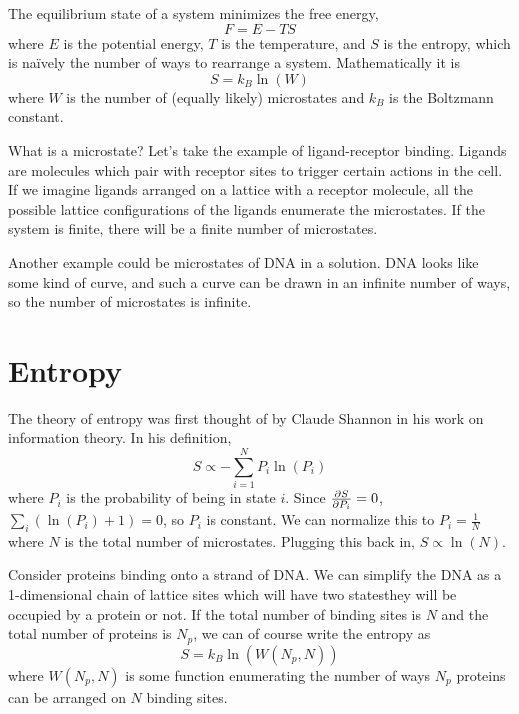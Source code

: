 \documentclass[a4paper,twoside,master.tex]{subfiles}
\begin{document}
The equilibrium state of a system minimizes the free energy,
\begin{equation}
    F = E - TS\tag{Free Energy}
\end{equation}
where $ E $ is the potential energy, $ T $ is the temperature, and $ S $ is the entropy, which is na\"ively the number of ways to rearrange a system. Mathematically it is
\begin{equation}
    S = k_B \ln(W)
\end{equation}
where $ W $ is the number of (equally likely) microstates and $ k_B $ is the Boltzmann constant.

What is a microstate? Let's take the example of ligand-receptor binding. Ligands are molecules which pair with receptor sites to trigger certain actions in the cell. If we imagine ligands arranged on a lattice with a receptor molecule, all the possible lattice configurations of the ligands enumerate the microstates. If the system is finite, there will be a finite number of microstates.

Another example could be microstates of DNA in a solution. DNA looks like some kind of curve, and such a curve can be drawn in an infinite number of ways, so the number of microstates is infinite.

\section{Entropy}\label{sec:entropy}

The theory of entropy was first thought of by Claude Shannon in his work on information theory. In his definition,
\begin{equation}
    S \propto - \sum_{i=1}^{N} P_i \ln(P_i)
\end{equation}
where $ P_i $ is the probability of being in state $ i $. Since $ \pdv{S}{P_i} = 0 $, $ \sum_i (\ln(P_i) + 1) = 0 $, so $ P_i $ is constant. We can normalize this to $ P_i = \frac{1}{N} $ where $ N $ is the total number of microstates. Plugging this back in, $ S \propto \ln(N) $.


Consider proteins binding onto a strand of DNA. We can simplify the DNA as a 1-dimensional chain of lattice sites which will have two states\textemdash they will be occupied by a protein or not. If the total number of binding sites is $ N $ and the total number of proteins is $ N_p $, we can of course write the entropy as
\begin{equation}
    S = k_B \ln(W(N_p, N))
\end{equation}
where $ W(N_p,N) $ is some function enumerating the number of ways $ N_p $ proteins can be arranged on $ N $ binding sites.
\end{document}
